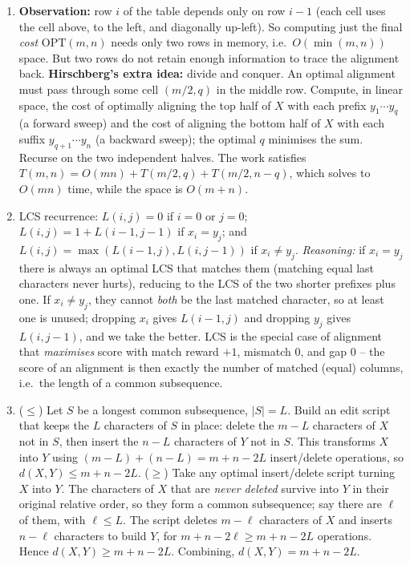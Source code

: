 \documentclass[11pt]{article}
\begin{document}
\begin{enumerate}[label=\textbf{A\arabic*.}, leftmargin=2.2em]
\item \textbf{Observation:} row $i$ of the table depends only on row $i-1$ (each cell uses
the cell above, to the left, and diagonally up-left). So computing just the final
\emph{cost} $\mathrm{OPT}(m,n)$ needs only two rows in memory, i.e.\ $O(\min(m,n))$ space.
But two rows do not retain enough information to trace the alignment back.
\textbf{Hirschberg's extra idea:} divide and conquer. An optimal alignment must pass through
some cell $(m/2, q)$ in the middle row. Compute, in linear space, the cost of optimally
aligning the top half of $X$ with each prefix $y_1\cdots y_q$ (a forward sweep) and the cost
of aligning the bottom half of $X$ with each suffix $y_{q+1}\cdots y_n$ (a backward sweep);
the optimal $q$ minimises the sum. Recurse on the two independent halves. The work satisfies
$T(m,n) = O(mn) + T(m/2, q) + T(m/2, n-q)$, which solves to $O(mn)$ time, while the space is
$O(m+n)$.

\item LCS recurrence: $L(i,j) = 0$ if $i=0$ or $j=0$; $L(i,j) = 1 + L(i-1,j-1)$ if
$x_i = y_j$; and $L(i,j) = \max(L(i-1,j), L(i,j-1))$ if $x_i \ne y_j$. \emph{Reasoning:} if
$x_i = y_j$ there is always an optimal LCS that matches them (matching equal last characters
never hurts), reducing to the LCS of the two shorter prefixes plus one. If $x_i \ne y_j$,
they cannot \emph{both} be the last matched character, so at least one is unused; dropping
$x_i$ gives $L(i-1,j)$ and dropping $y_j$ gives $L(i,j-1)$, and we take the better. LCS is
the special case of alignment that \emph{maximises} score with match reward $+1$, mismatch
$0$, and gap $0$ -- the score of an alignment is then exactly the number of matched
(equal) columns, i.e.\ the length of a common subsequence.

\item ($\le$) Let $S$ be a longest common subsequence, $|S| = L$. Build an edit script that
keeps the $L$ characters of $S$ in place: delete the $m - L$ characters of $X$ not in $S$,
then insert the $n - L$ characters of $Y$ not in $S$. This transforms $X$ into $Y$ using
$(m-L) + (n-L) = m + n - 2L$ insert/delete operations, so $d(X,Y) \le m + n - 2L$. ($\ge$)
Take any optimal insert/delete script turning $X$ into $Y$. The characters of $X$ that are
\emph{never deleted} survive into $Y$ in their original relative order, so they form a common
subsequence; say there are $\ell$ of them, with $\ell \le L$. The script deletes $m - \ell$
characters of $X$ and inserts $n - \ell$ characters to build $Y$, for $m + n - 2\ell \ge m +
n - 2L$ operations. Hence $d(X,Y) \ge m + n - 2L$. Combining, $d(X,Y) = m + n - 2L$.


\end{enumerate}
\end{document}
